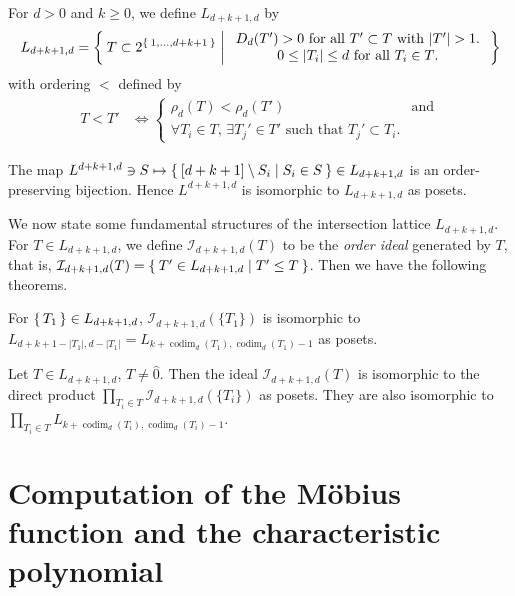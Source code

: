 \documentclass{wstmp}
\begin{document}
\begin{definition}
\label{def:DefOfLattice}
For $d>0$ and $k\geq 0$, 
we define $L_{d+k+1,d}$ by
\begin{align*}
L_{d+k+1,d}=
\Set{T\subset 2^{\Set{1,\ldots,d+k+1 }} | 
\begin{array}{c}
\text{$D_d(T')>0$ for all $T'\subset T$ with ${\left|{T'}\right|}>1$.}\\
\text{$0\leq {\left|{T_i}\right|} \leq d$ for all $T_i \in T$.}
\end{array}
}
\end{align*}
with ordering  $<$ defined by
\begin{align*}
T<T' 
&\iff 
\begin{cases}
\rho_d(T) < \rho_d(T') & \text{and} \\
\text{$\forall T_i \in T$, $\exists T_j' \in T' $ such that $T_j' \subset T_i$.}
\end{cases}
\end{align*} 
\end{definition}
The map 
$L^{d+k+1,d} \ni S \mapsto \Set{[d+k+1] \setminus S_i | S_i \in S} \in L_{d+k+1,d}$ 
is an order-preserving bijection.
Hence $L^{d+k+1,d}$ is isomorphic to  $L_{d+k+1,d}$
as posets.

We now state some fundamental structures of the intersection lattice $L_{d+k+1,d}$.
For $T\in L_{d+k+1,d}$,
we define ${\mathcal{I}}_{d+k+1,d}(T)$ to be the {\it order ideal} generated by $T$,
that is, ${\mathcal{I}}_{d+k+1,d}(T)=\Set{T' \in L_{d+k+1,d}|T'\leq T}$.
Then we have the following theorems\cite{1009.3676}.
\begin{theorem}
\label{lem:single-set-ideal}
For $\set{T_1}\in L_{d+k+1,d}$, 
${\mathcal{I}}_{d+k+1,d}(\{T_1\})$ is isomorphic to 
$L_{d+k+1-{\left|{T_1}\right|},d-{\left|{T_1}\right|}}=L_{k+{\operatorname{codim}}_d(T_1),{\operatorname{codim}}_d(T_1)-1}$
as posets.
\end{theorem}
\begin{theorem}
\label{thm:structure of ideal is directprod}
Let $T\in L_{d+k+1,d}$, $T\neq {\hat{0}}$. 
Then the ideal ${\mathcal{I}}_{d+k+1,d}(T)$
is isomorphic to the direct product 
$\prod_{T_i \in T} {\mathcal{I}}_{d+k+1,d}(\{T_i\})$
as posets.  They are also isomorphic to 
$\prod_{T_i \in T} L_{k+{\operatorname{codim}}_d(T_i),{\operatorname{codim}}_d(T_i)-1}$.
\end{theorem}

\section{Computation of the M\"obius function and the characteristic polynomial}
\label{sec:computation}
\end{document}
